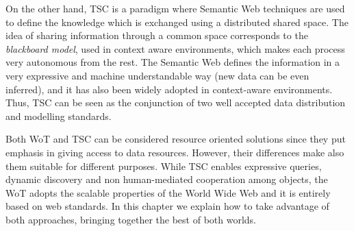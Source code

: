 On the other hand, TSC is a paradigm where Semantic Web techniques are used to define the knowledge which is exchanged using a distributed shared space.
The idea of sharing information through a common space corresponds to the \textit{blackboard model}, used in context aware environments, which makes each process very autonomous from the rest.
The Semantic Web defines the information in a very expressive and machine understandable way (new data can be even inferred), and it has also been widely adopted in context-aware environments.
Thus, TSC can be seen as the conjunction of two well accepted data distribution and modelling standards.

Both WoT and TSC can be considered resource oriented solutions since they put emphasis in giving access to data resources.
However, their differences make also them suitable for different purposes.
While TSC enables expressive queries, dynamic discovery and non human-mediated cooperation among objects, the WoT adopts the scalable properties of the World Wide Web and it is entirely based on web standards.
In this chapter we explain how to take advantage of both approaches, bringing together the best of both worlds.





